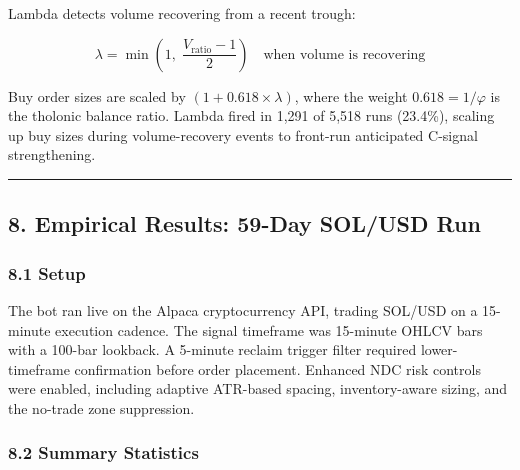 \documentclass[
  11pt,
  letterpaper,
]{article}
\begin{document}
Lambda detects volume recovering from a recent trough:

\[\lambda = \min\!\left(1,\; \frac{V_{\text{ratio}} - 1}{2}\right) \quad \text{when volume is recovering}\]

Buy order sizes are scaled by \((1 + 0.618 \times \lambda)\), where the
weight \(0.618 = 1/\varphi\) is the tholonic balance ratio. Lambda fired
in 1,291 of 5,518 runs (23.4\%), scaling up buy sizes during
volume-recovery events to front-run anticipated C-signal strengthening.

\begin{center}\rule{0.5\linewidth}{0.5pt}\end{center}

\subsection{8. Empirical Results: 59-Day SOL/USD
Run}\label{empirical-results-59-day-solusd-run}

\subsubsection{8.1 Setup}\label{setup}

The bot ran live on the Alpaca cryptocurrency API, trading SOL/USD on a
15-minute execution cadence. The signal timeframe was 15-minute OHLCV
bars with a 100-bar lookback. A 5-minute reclaim trigger filter required
lower-timeframe confirmation before order placement. Enhanced NDC risk
controls were enabled, including adaptive ATR-based spacing,
inventory-aware sizing, and the no-trade zone suppression.

\subsubsection{8.2 Summary Statistics}\label{summary-statistics}
\end{document}
